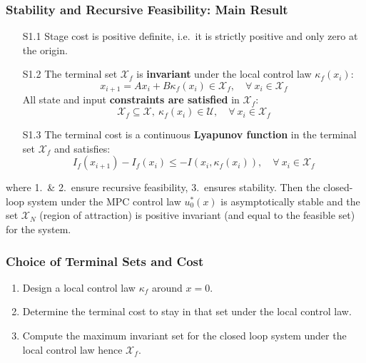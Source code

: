 \subsubsection{Stability and Recursive Feasibility: Main Result}
\begin{enumerate}[leftmargin=24pt]
    \item[S1.1] Stage cost is positive definite, i.e.\ it is strictly positive and only zero at the origin.
    \item[S1.2] The terminal set $\mathcal{X}_f$ is \textbf{invariant} under the local control law $\kappa_f(x_i)$:
          \begin{equation*}
              x_{i+1} = Ax_i +B\kappa_f(x_i) \in \mathcal{X}_f, \quad \forall\: x_i \in \mathcal{X}_f
          \end{equation*}
          All state and input \textbf{constraints are satisfied} in $\mathcal{X}_f$:
          \begin{equation*}
              \mathcal{X}_f \subseteq \mathcal{X}, \: \kappa_f(x_i) \in \mathcal{U}, \quad \forall\: x_i \in \mathcal{X}_f
          \end{equation*}
    \item[S1.3] The terminal cost is a continuous \textbf{Lyapunov function} in the terminal set $\mathcal{X}_f$ and satisfies:
          \begin{equation*}
              I_f(x_{i+1})-I_f(x_i) \leq -I(x_i,\kappa_f(x_i)), \quad \forall\: x_i \in \mathcal{X}_f
          \end{equation*}
\end{enumerate}
where 1.\ \& 2.\ ensure recursive feasibility, 3.\ ensures stability.
\newpar{}
Then the closed-loop system under the MPC control law $u_0^*(x)$ is asymptotically stable and the set $\mathcal{X}_N$ (region of attraction) is positive invariant (and equal to the feasible set) for the system.

\subsubsection{Choice of Terminal Sets and Cost}
\begin{enumerate}
    \item Design a local control law $\kappa_f$ around $x=0$.
    \item Determine the terminal cost to stay in that set under the local control law.
    \item Compute the maximum invariant set for the closed loop system under the local control law hence $\mathcal{X}_f$.
\end{enumerate}

